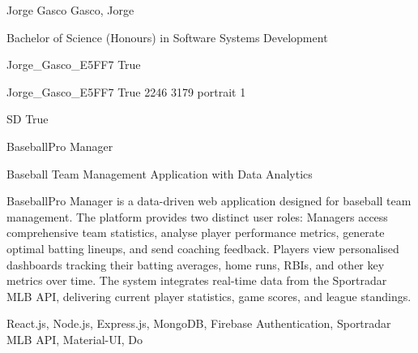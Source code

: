 
\begingroup{}\relax



\def\Key{Jorge_Gasco_E5FF7}

{Jorge Gasco}
{Gasco, Jorge}

{Bachelor of Science (Honours) in Software Systems Development}

{Jorge_Gasco_E5FF7}
{True}

{Jorge_Gasco_E5FF7}
{True}
{2246}
{3179}
{portrait}
{1}

{SD}
{True}

{BaseballPro Manager}

{Baseball Team Management Application with Data Analytics}

{BaseballPro Manager is a data-driven web application designed for baseball team management. The platform provides two distinct user roles: Managers access comprehensive team statistics, analyse player performance metrics, generate optimal batting lineups, and send coaching feedback. Players view personalised dashboards tracking their batting averages, home runs, RBIs, and other key metrics over time. The system integrates real-time data from the Sportradar MLB API, delivering current player statistics, game scores, and league standings.}

{React.js, Node.js, Express.js, MongoDB, Firebase Authentication, Sportradar MLB API, Material-UI, Do}

